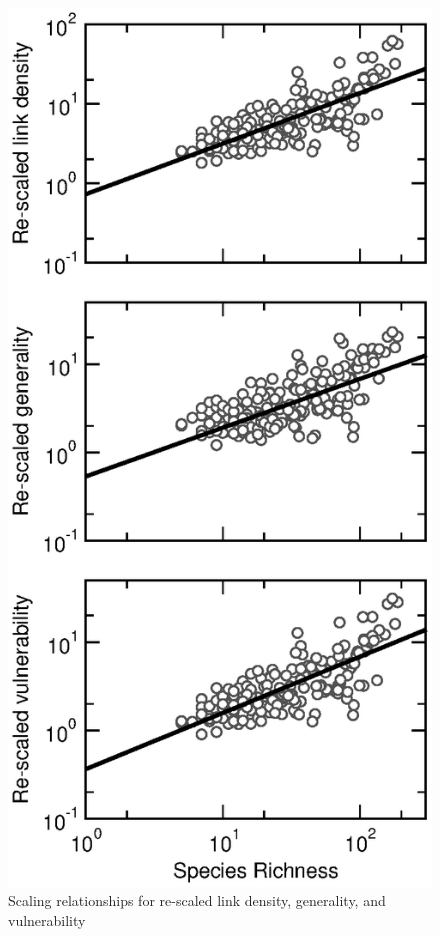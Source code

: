 \documentclass[12pt]{article}
\begin{document}
\begin{figure}[h]
\centerline{\includegraphics*[height=.5\textheight]{Figures/by_TL/scaling_with_S/proportions/S_fitlines_nonts.eps}}
\caption{Scaling relationships for re-scaled link density, generality, and vulnerability 
}
\end{figure}
\end{document}
